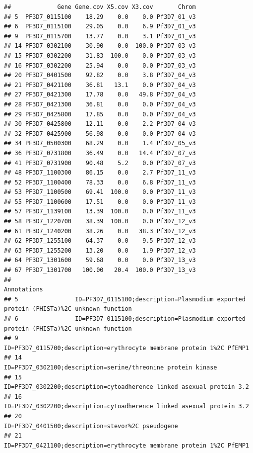 \documentclass[12pt, a4paper]{article}\usepackage[]{graphicx}\usepackage[]{color}
\makeatletter
\newenvironment{kframe}{%
 \def\at@end@of@kframe{}%
 \ifinner\ifhmode%
  \def\at@end@of@kframe{\end{minipage}}%
  \begin{minipage}{\columnwidth}%
 \fi\fi%
 \def\FrameCommand##1{\hskip\@totalleftmargin \hskip-\fboxsep
 \colorbox{shadecolor}{##1}\hskip-\fboxsep
     \hskip-\linewidth \hskip-\@totalleftmargin \hskip\columnwidth}%
 \MakeFramed {\advance\hsize-\width
   \@totalleftmargin\z@ \linewidth\hsize
   \@setminipage}}%
 {\par\unskip\endMakeFramed%
 \at@end@of@kframe}
\newenvironment{knitrout}{}{} %
\makeatother
\begin{document}
\begin{knitrout}
\begin{kframe}
\begin{alltt}
\end{alltt}
\begin{verbatim}
##             Gene Gene.cov X5.cov X3.cov       Chrom
## 5  PF3D7_0115100    18.29    0.0    0.0 Pf3D7_01_v3
## 6  PF3D7_0115100    29.05    0.0    6.9 Pf3D7_01_v3
## 9  PF3D7_0115700    13.77    0.0    3.1 Pf3D7_01_v3
## 14 PF3D7_0302100    30.90    0.0  100.0 Pf3D7_03_v3
## 15 PF3D7_0302200    31.83  100.0    0.0 Pf3D7_03_v3
## 16 PF3D7_0302200    25.94    0.0    0.0 Pf3D7_03_v3
## 20 PF3D7_0401500    92.82    0.0    3.8 Pf3D7_04_v3
## 21 PF3D7_0421100    36.81   13.1    0.0 Pf3D7_04_v3
## 27 PF3D7_0421300    17.78    0.0   49.8 Pf3D7_04_v3
## 28 PF3D7_0421300    36.81    0.0    0.0 Pf3D7_04_v3
## 29 PF3D7_0425800    17.85    0.0    0.0 Pf3D7_04_v3
## 30 PF3D7_0425800    12.11    0.0    2.2 Pf3D7_04_v3
## 32 PF3D7_0425900    56.98    0.0    0.0 Pf3D7_04_v3
## 34 PF3D7_0500300    68.29    0.0    1.4 Pf3D7_05_v3
## 36 PF3D7_0731800    36.49    0.0   14.4 Pf3D7_07_v3
## 41 PF3D7_0731900    90.48    5.2    0.0 Pf3D7_07_v3
## 48 PF3D7_1100300    86.15    0.0    2.7 Pf3D7_11_v3
## 52 PF3D7_1100400    78.33    0.0    6.8 Pf3D7_11_v3
## 53 PF3D7_1100500    69.41  100.0    0.0 Pf3D7_11_v3
## 55 PF3D7_1100600    17.51    0.0    0.0 Pf3D7_11_v3
## 57 PF3D7_1139100    13.39  100.0    0.0 Pf3D7_11_v3
## 58 PF3D7_1220700    38.39  100.0    0.0 Pf3D7_12_v3
## 61 PF3D7_1240200    38.26    0.0   38.3 Pf3D7_12_v3
## 62 PF3D7_1255100    64.37    0.0    9.5 Pf3D7_12_v3
## 63 PF3D7_1255200    13.20    0.0    1.9 Pf3D7_12_v3
## 64 PF3D7_1301600    59.68    0.0    0.0 Pf3D7_13_v3
## 67 PF3D7_1301700   100.00   20.4  100.0 Pf3D7_13_v3
##                                                                                            Annotations
## 5                ID=PF3D7_0115100;description=Plasmodium exported protein (PHISTa)%2C unknown function
## 6                ID=PF3D7_0115100;description=Plasmodium exported protein (PHISTa)%2C unknown function
## 9                                ID=PF3D7_0115700;description=erythrocyte membrane protein 1%2C PfEMP1
## 14                                        ID=PF3D7_0302100;description=serine/threonine protein kinase
## 15                               ID=PF3D7_0302200;description=cytoadherence linked asexual protein 3.2
## 16                               ID=PF3D7_0302200;description=cytoadherence linked asexual protein 3.2
## 20                                                   ID=PF3D7_0401500;description=stevor%2C pseudogene
## 21                               ID=PF3D7_0421100;description=erythrocyte membrane protein 1%2C PfEMP1

\end{verbatim}
\end{kframe}
\end{knitrout}
\end{document}
